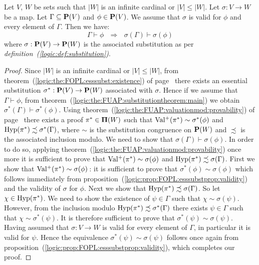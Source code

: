 \begin{prop}\label{logic:prop:FUAP:substitutiontheorem:valid}
Let $V$, $W$ be sets such that $|W|$ is an infinite cardinal or
$|V|\leq|W|$. Let $\sigma:V\to W$ be a map. Let $\Gamma\subseteq\mbox{${\bf P}(V)$}$
and $\phi\in\mbox{${\bf P}(V)$}$. We assume that $\sigma$ is valid for $\phi$ and
every element of $\Gamma$. Then we have:
    \[
    \Gamma\vdash\phi\ \ \ \Rightarrow\ \ \ \sigma(\Gamma)\vdash\sigma(\phi)
    \]
where $\sigma:\mbox{${\bf P}(V)$}\to{\bf P}(W)$ is the associated substitution as
per {\em definition~(\ref{logic:def:substitution})}.
\end{prop}
\begin{proof}
Since $|W|$ is an infinite cardinal or $|V|\leq|W|$, from
theorem~(\ref{logic:the:FOPL:esssubst:existence}) of
page~\pageref{logic:the:FOPL:esssubst:existence} there exists an
essential substitution $\sigma^{*}:\mbox{${\bf P}(V)$}\to{\bf P}(W)$ associated with
$\sigma$. Hence if we assume that $\Gamma\vdash\phi$, from
theorem~(\ref{logic:the:FUAP:substitutiontheorem:main}) we obtain
$\sigma^{*}(\Gamma)\vdash\sigma^{*}(\phi)$. Using
theorem~(\ref{logic:the:FUAP:valuationmod:provability}) of
page~\pageref{logic:the:FUAP:valuationmod:provability} there exists
a proof $\pi^{*}\in{\bf\Pi}(W)$ such that
$\mbox{$\rm Val^{+}$}(\pi^{*})\sim\sigma^{*}(\phi)$ and
$\mbox{\rm Hyp}(\pi^{*})\precsim\sigma^{*}(\Gamma)$, where $\sim$ is the
substitution congruence on ${\bf P}(W)$ and $\precsim$ is the
associated inclusion modulo. We need to show that
$\sigma(\Gamma)\vdash\sigma(\phi)$. In order to do so, applying
theorem~(\ref{logic:the:FUAP:valuationmod:provability}) once more it
is sufficient to prove that $\mbox{$\rm Val^{+}$}(\pi^{*})\sim\sigma(\phi)$ and
$\mbox{\rm Hyp}(\pi^{*})\precsim\sigma(\Gamma)$. First we show that
$\mbox{$\rm Val^{+}$}(\pi^{*})\sim\sigma(\phi)$\,: it is sufficient to prove that
$\sigma^{*}(\phi)\sim\sigma(\phi)$ which follows immediately from
proposition~(\ref{logic:prop:FOPL:esssubstprop:validity}) and the
validity of $\sigma$ for $\phi$. Next we show that
$\mbox{\rm Hyp}(\pi^{*})\precsim\sigma(\Gamma)$. So let
$\chi\in\mbox{\rm Hyp}(\pi^{*})$. We need to show the existence of
$\psi\in\Gamma$ such that $\chi\sim\sigma(\psi)$. However, from the
inclusion modulo $\mbox{\rm Hyp}(\pi^{*})\precsim\sigma^{*}(\Gamma)$ there
exists $\psi\in\Gamma$ such that $\chi\sim\sigma^{*}(\psi)$. It is
therefore sufficient to prove that
$\sigma^{*}(\psi)\sim\sigma(\psi)$. Having assumed that $\sigma:V\to
W$ is valid for every element of $\Gamma$, in particular it is valid
for $\psi$. Hence the equivalence $\sigma^{*}(\psi)\sim\sigma(\psi)$
follows once again from
proposition~(\ref{logic:prop:FOPL:esssubstprop:validity}), which
completes our proof.
\end{proof}
